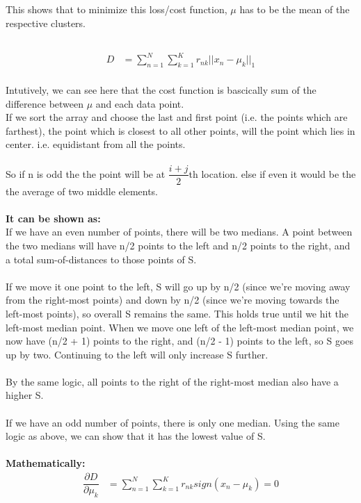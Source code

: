 \documentclass[paper=a4, fontsize=11pt]{scrartcl} %
\numberwithin{equation}{section} %
\numberwithin{figure}{section} %
\numberwithin{table}{section} %
\begin{document}
This shows that to minimize this loss/cost function, $\mu$ has to be the mean of the respective clusters.

\subsection{}
\begin{align*}
D &= \sum_{n=1}^{N}\sum_{k=1}^{K}r_{nk} ||x_{n} - \mu_{k}||_{1}\\
\end{align*}

Intutively, we can see here that the cost function is bascically sum of the difference between $\mu$ and each data point.\\
If we sort the array and choose the last and first point (i.e. the points which are farthest), the point which is closest to all other points, will the point which lies in center. i.e. equidistant from all the points.\\\\
So if n is odd the the point will be at $\dfrac{i+j}{2}$th location. else if even it would be the the average of two middle elements.\\\\

\textbf{It can be shown as:}\\
If we have an even number of points, there will be two medians. A point between the two medians will have n/2 points to the left and n/2 points to the right, and a total sum-of-distances to those points of S.\\\\
If we move it one point to the left, S will go up by n/2 (since we're moving away from the right-most points) and down by n/2 (since we're moving towards the left-most points), so overall S remains the same. This holds true until we hit the left-most median point. When we move one left of the left-most median point, we now have (n/2 + 1) points to the right, and (n/2 - 1) points to the left, so S goes up by two. Continuing to the left will only increase S further.\\\\
By the same logic, all points to the right of the right-most median also have a higher S.\\\\
If we have an odd number of points, there is only one median. Using the same logic as above, we can show that it has the lowest value of S.\\\\
\textbf{Mathematically:}\\
\begin{align*}
\dfrac{\partial D}{\partial \mu_{k}} &= \sum_{n=1}^{N}\sum_{k=1}^{K}r_{nk} sign(x_{n} - \mu_{k}) = 0
\end{align*}
\end{document}
